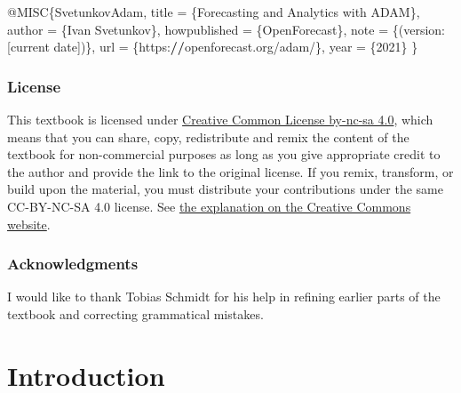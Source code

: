 \documentclass[
]{book}
\newenvironment{Shaded}{\begin{snugshade}}{\end{snugshade}}
\newcommand{\DecValTok}[1]{\textcolor[rgb]{0.00,0.00,0.81}{#1}}
\newcommand{\ErrorTok}[1]{\textcolor[rgb]{0.64,0.00,0.00}{\textbf{#1}}}
\newcommand{\NormalTok}[1]{#1}
\newcommand{\OtherTok}[1]{\textcolor[rgb]{0.56,0.35,0.01}{#1}}
\newcommand{\SpecialCharTok}[1]{\textcolor[rgb]{0.00,0.00,0.00}{#1}}
\theoremstyle{definition}
\theoremstyle{definition}
\theoremstyle{definition}
\theoremstyle{definition}
\theoremstyle{remark}
\begin{document}
\begin{Shaded}
\begin{Highlighting}[]
\SpecialCharTok{@}\NormalTok{MISC\{SvetunkovAdam,}
\NormalTok{    title }\OtherTok{=}\NormalTok{ \{Forecasting and Analytics with ADAM\},}
\NormalTok{    author }\OtherTok{=}\NormalTok{ \{Ivan Svetunkov\},}
\NormalTok{    howpublished }\OtherTok{=}\NormalTok{ \{OpenForecast\},}
\NormalTok{    note }\OtherTok{=}\NormalTok{ \{(version}\SpecialCharTok{:}\NormalTok{ [current date])\},}
\NormalTok{    url }\OtherTok{=}\NormalTok{ \{https}\SpecialCharTok{:}\ErrorTok{//}\NormalTok{openforecast.org}\SpecialCharTok{/}\NormalTok{adam}\SpecialCharTok{/}\NormalTok{\},}
\NormalTok{    year }\OtherTok{=}\NormalTok{ \{}\DecValTok{2021}\NormalTok{\}}
\NormalTok{\}}
\end{Highlighting}
\end{Shaded}

\hypertarget{license}{%
\subsection*{License}\label{license}}

This textbook is licensed under \href{https://creativecommons.org/licenses/by-nc-sa/4.0/}{Creative Common License by-nc-sa 4.0}, which means that you can share, copy, redistribute and remix the content of the textbook for non-commercial purposes as long as you give appropriate credit to the author and provide the link to the original license. If you remix, transform, or build upon the material, you must distribute your contributions under the same CC-BY-NC-SA 4.0 license. See \href{https://creativecommons.org/licenses/by-nc-sa/4.0/}{the explanation on the Creative Commons website}.

\hypertarget{acknowledgments}{%
\subsection*{Acknowledgments}\label{acknowledgments}}

I would like to thank Tobias Schmidt for his help in refining earlier parts of the textbook and correcting grammatical mistakes.

\hypertarget{intro}{%
\chapter{Introduction}\label{intro}}
\end{document}
